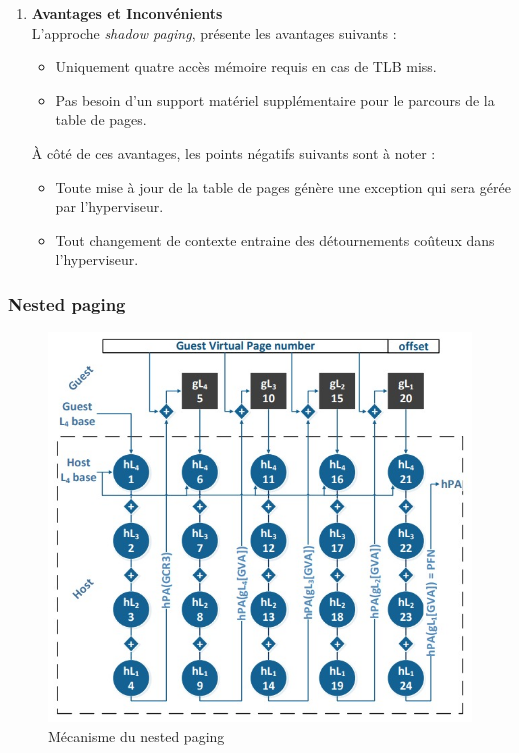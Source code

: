 \begin{enumerate}[label=\textbf{(\roman*)}]
    \item \textbf{Avantages et Inconvénients}\\
    L'approche \textit{shadow paging}, présente les avantages suivants :
    \begin{itemize}
        \item Uniquement quatre accès mémoire requis en cas de TLB miss.
        \item Pas besoin d'un support matériel supplémentaire pour le parcours de la table de pages.
    \end{itemize}
    
    À côté de ces avantages, les points négatifs suivants sont à noter :
    \begin{itemize}
        \item Toute mise à jour de la table de pages génère une exception qui sera gérée par l'hyperviseur.
        \item Tout changement de contexte entraine des détournements coûteux dans l'hyperviseur.
    \end{itemize}
\end{enumerate}

\subsubsection{Nested paging}
\label{subsubsection:nested_paging}

\begin{figure}[H]
        \centering
        \includegraphics[scale=.5]{chapters/1/fig1/nested_paging}
        \caption{Mécanisme du nested paging}
        \label{fig:parcours_2D}
\end{figure}

